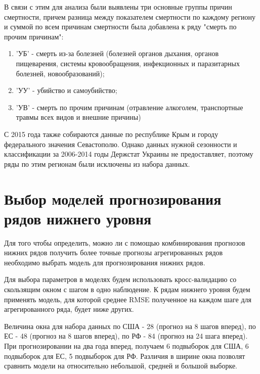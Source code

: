 \documentclass[12pt,a4paper, oneside]{extreport}
\begin{document}
В связи с этим для анализа были выявлены три основные группы причин смертности, причем разница между показателем смертности по каждому региону и суммой по всем причинам смертности была добавлена к ряду "смерть по прочим причинам":  



\begin{enumerate}
	\item  'УБ' - смерть из-за болезней (болезней органов дыхания, органов пищеварения, системы кровообращения, инфекционных и паразитарных болезней, новообразований);
\item 'УУ'  -  убийство и самоубийство;
\item 'УВ'  -  смерть по прочим причинам (отравление алкоголем, транспортные травмы всех видов и внешние причины)
\end{enumerate}


С 2015 года также собираются данные по республике Крым и городу федерального значения Севастополю. Однако данных нужной сезонности и классификации за 2006-2014 годы Держстат Украины не предоставляет, поэтому ряды по этим регионам были исключены из набора данных. 




\section{Выбор моделей прогнозирования рядов нижнего уровня}

Для того чтобы определить, можно ли с помощью комбинирования прогнозов нижних рядов получить более точные прогнозы агрегированных рядов необходимо выбрать модель для прогнозирования нижних рядов. 



Для выбора параметров в моделях будем использовать кросс-валидацию  со скользящим окном с шагом в одно наблюдение. К рядам нижнего уровня будем применять модель, для которой среднее RMSE полученное на каждом шаге для агрегированного ряда, будет ниже других. 

Величина окна для набора данных по США - 28 (прогноз на 8 шагов вперед), по ЕС - 48 (прогноз на 8 шагов вперед), по РФ - 84 (прогноз на 24 шага вперед). При прогнозировании на два года вперед, получаем 6 подвыборок для США,  6 подвыборок для ЕС,  5 подвыборок для РФ.  Различия в ширине окна позволят сравнить модели на относительно небольшой, средней и большой выборке. 
\end{document}
